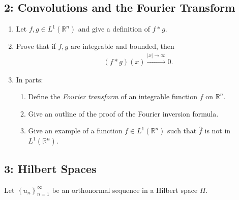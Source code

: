 \hypertarget{convolutions-and-the-fourier-transform}{%
\subsection{2: Convolutions and the Fourier
Transform}\label{convolutions-and-the-fourier-transform}}

\begin{enumerate}
\def\labelenumi{\alph{enumi}.}
\item
  Let \(f, g\in L^1({\mathbb{R}}^n)\) and give a definition of
  \(f\ast g\).
\item
  Prove that if \(f, g\) are integrable and bounded, then
  \begin{align*}
  (f\ast g)(x) \overset{{\left\lvert {x} \right\rvert}\to\infty}\to 0
  .\end{align*}
\item
  In parts:

  \begin{enumerate}
  \def\labelenumii{\arabic{enumii}.}
  \tightlist
  \item
    Define the \emph{Fourier transform} of an integrable function \(f\)
    on \({\mathbb{R}}^n\).
  \item
    Give an outline of the proof of the Fourier inversion formula.
  \item
    Give an example of a function \(f\in L^1({\mathbb{R}}^n)\) such that
    \(\widehat{f}\) is not in \(L^1({\mathbb{R}}^n)\).
  \end{enumerate}
\end{enumerate}

\hypertarget{hilbert-spaces}{%
\subsection{3: Hilbert Spaces}\label{hilbert-spaces}}

\label{hilbert_space_exam_question}

Let \(\left\{{u_n}\right\}_{n=1}^\infty\) be an orthonormal sequence in
a Hilbert space \(H\).

